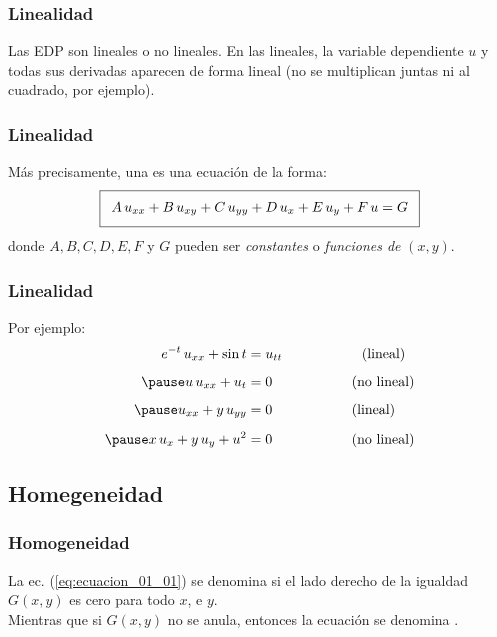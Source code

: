 \documentclass[12pt]{beamer}
\begin{document}
\begin{frame}
\frametitle{Linealidad}
Las EDP son lineales o no lineales. \pause En las lineales, la variable dependiente $u$ y todas sus derivadas aparecen de forma lineal (no se multiplican juntas ni al cuadrado, por ejemplo).
\end{frame}
\begin{frame}
\frametitle{Linealidad}
Más precisamente, una  es una ecuación de la forma:
\pause
\begin{align}
\addtolength{\fboxsep}{5pt}\boxed{ A \, u_{xx} + B \, u_{xy} + C \, u_{yy} + D \, u_{x} + E \, u_{y} + F \, u = G}
\label{eq:ecuacion_01_01}
\end{align}
donde $A, B, C, D, E, F$ y $G$ pueden ser \emph{constantes} o \emph{funciones de} $(x, y)$.
\end{frame}
\begin{frame}
\frametitle{Linealidad}
Por ejemplo:
\begin{eqnarray*}
\begin{aligned}
e^{-t} \, u_{xx} + \sin t &= u_{tt} \hspace{2cm} \mbox{(lineal)} \\[0.5em] \pause
u \, u_{xx} + u_{t} &= 0 \hspace{2cm} \mbox{(no lineal)} \\[0.5em] \pause
u_{xx} + y \, u_{yy} &= 0 \hspace{2cm} \mbox{(lineal)} \\[0.5em] \pause
x \, u_{x} + y \, u_{y} + u^{2} &= 0 \hspace{2cm} \mbox{(no lineal)}
\end{aligned}
\end{eqnarray*}
\end{frame}

\subsection*{Homegeneidad}

\begin{frame}
\frametitle{Homogeneidad}
La ec. (\ref{eq:ecuacion_01_01}) se denomina  si el lado derecho de la igualdad $G (x, y)$ es cero para todo $x$, e $y$.
\\
\bigskip
\pause
Mientras que si $G (x, y)$ no se anula, entonces la ecuación se denomina .
\end{frame}
\end{document}
